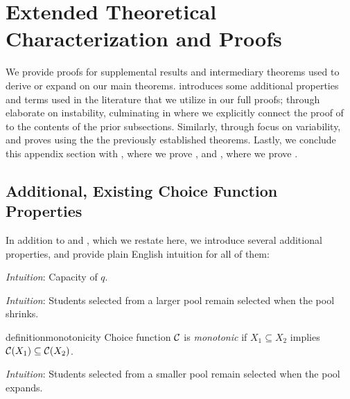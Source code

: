 \onecolumn


\section{Extended Theoretical Characterization and Proofs} \label{sec:proofs-appendix}
We provide proofs for supplemental results and intermediary theorems used to derive or expand on our main theorems.  introduces some additional properties and terms used in the literature that we utilize in our full proofs;  through  elaborate on instability, culminating in  where we explicitly connect the proof of  to the contents of the prior subsections. Similarly,  through  focus on variability, and  proves  using the the previously established theorems. Lastly, we conclude this appendix section with , where we prove , and , where we prove .

\subsection{Additional, Existing Choice Function Properties}\label{sec:properties-appendix}
In addition to  and , which we restate here, we introduce several additional properties, and provide plain English intuition for all of them:

\qacceptance*
\textit{Intuition}: Capacity of $q$.

\substitutability*
\textit{Intuition}: Students selected from a larger pool remain selected when the pool shrinks.

\begin{restatable}[Monotonicity]{definition}{monotonicity}
\label{def:monotonicity}
Choice function $\mathcal{C}$ is \textit{monotonic} if $X_1 \subseteq X_2$ implies $\mathcal{C}(X_1) \subseteq \mathcal{C}(X_2)$.
\end{restatable}
\textit{Intuition}: Students selected from a smaller pool remain selected when the pool expands.


